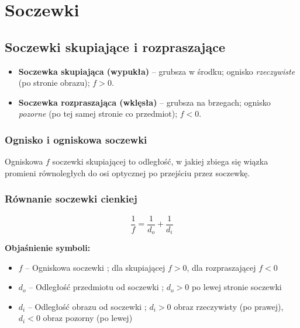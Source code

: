\documentclass[12pt,a4paper]{article}
\newcommand{\oznaczenie}[2]{%
  \item $#1$ -- #2%
}
\begin{document}
\newpage
\section{Soczewki}

\subsection{Soczewki skupiające i rozpraszające}

\begin{itemize}
  \item \textbf{Soczewka skupiająca (wypukła)} -- grubsza w środku; ognisko
        \emph{rzeczywiste} (po stronie obrazu); $f>0$.
  \item \textbf{Soczewka rozpraszająca (wklęsła)} -- grubsza na brzegach; ognisko
        \emph{pozorne} (po tej samej stronie co przedmiot); $f<0$.
\end{itemize}

\subsubsection{Ognisko i ogniskowa soczewki}

Ogniskowa $f$ soczewki skupiającej to odległość, w jakiej zbiega się wiązka promieni
równoległych do osi optycznej po przejściu przez soczewkę.

\subsubsection{Równanie soczewki cienkiej}

\begin{wzorbox}
\begin{equation}
  \frac{1}{f} = \frac{1}{d_o} + \frac{1}{d_i}
  \label{eq:soczewka_cienka}
\end{equation}
\end{wzorbox}

\begin{objasnbox}
\textbf{Objaśnienie symboli:}
\begin{itemize}[leftmargin=2em]
  \oznaczenie{f}{Ogniskowa soczewki \quad [\textbf{m}]; dla skupiającej $f>0$,
                dla rozpraszającej $f<0$}
  \oznaczenie{d_o}{Odległość przedmiotu od soczewki \quad [\textbf{m}]; $d_o>0$
                po lewej stronie soczewki}
  \oznaczenie{d_i}{Odległość obrazu od soczewki \quad [\textbf{m}]; $d_i>0$
                obraz rzeczywisty (po prawej), $d_i<0$ obraz pozorny (po lewej)}
\end{itemize}
\end{objasnbox}
\end{document}
